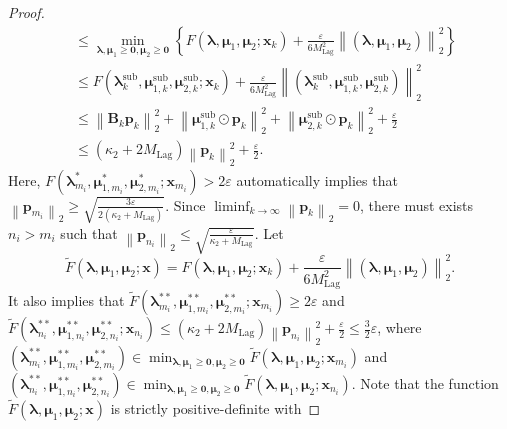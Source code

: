\documentclass[aos]{imsart}
\numberwithin{equation}{section}
\theoremstyle{plain}
\begin{document}
\begin{appendix}
\begin{proof}
\begin{equation}
\begin{split}
            & \leq \min_{\bm{\lambda}, \bm{\mu}_{1} \geq \bm{0}, \bm{\mu}_{2} \geq \bm{0}} \left\{F(\bm{\lambda}, \bm{\mu}_{1}, \bm{\mu}_2; \bm{x}_k) + \frac{\varepsilon}{6 M_{\text{Lag}}^2 } \left\|(\bm{\lambda}, \bm{\mu}_{1}, \bm{\mu}_2) \right\|_2^2 \right\} \\
            & \leq F(\bm{\lambda}_{k}^{\text{sub}}, \bm{\mu}_{1,k}^{\text{sub}}, \bm{\mu}_{2,k}^{\text{sub}}; \bm{x}_k) + \frac{\varepsilon}{6 M_{\text{Lag}}^2 } \left\|(\bm{\lambda}_{k}^{\text{sub}}, \bm{\mu}_{1,k}^{\text{sub}}, \bm{\mu}_{2,k}^{\text{sub}}) \right\|_2^2 \\
            & \leq \left\| \bm{B}_k \bm{p}_k \right\|_2^2 + \left\| \bm{\mu}_{1,k}^{\text{sub}} \odot \bm{p}_k \right\|_2^2 + \left\| \bm{\mu}_{2,k}^{\text{sub}} \odot \bm{p}_k \right\|_2^2 + \frac{\varepsilon}{2}\\
            & \leq (\kappa_2 + 2 M_{\text{Lag}}) \left\| \bm{p}_k \right\|_2^2 + \frac{\varepsilon}{2}.
        \end{split}
    \end{equation}
    Here, $F(\bm{\lambda}_{m_i}^{*}, \bm{\mu}_{1,m_i}^{*}, \bm{\mu}_{2,m_i}^{*}; \bm{x}_{m_i}) > 2 \varepsilon$ automatically implies that $\left\| \bm{p}_{m_i} \right\|_2 \geq \sqrt{\frac{3\varepsilon}{2(\kappa_2 + M_{\text{Lag}}) }}$. Since $\mathop{\lim \inf}_{k \to \infty} \left\| \bm{p}_k \right\|_2 = 0$, there must exists $n_i > m_i$ such that $\left\| \bm{p}_{n_i} \right\|_2 \leq \sqrt{\frac{\varepsilon}{\kappa_2 + M_{\text{Lag}} }}$.
    Let
    \begin{equation*}
        \widetilde{F}(\bm{\lambda}, \bm{\mu}_{1}, \bm{\mu}_2; \bm{x}) = F(\bm{\lambda}, \bm{\mu}_{1}, \bm{\mu}_2; \bm{x}_k) + \frac{\varepsilon}{6 M_{\text{Lag}}^2 } \left\|(\bm{\lambda}, \bm{\mu}_{1}, \bm{\mu}_2) \right\|_2^2.
    \end{equation*}
    It also implies that $\widetilde{F}(\bm{\lambda}_{m_i}^{**}, \bm{\mu}_{1,m_i}^{**}, \bm{\mu}_{2,m_i}^{**}; \bm{x}_{m_i}) \geq 2 \varepsilon$ and $ \widetilde{F}(\bm{\lambda}_{n_i}^{**}, \bm{\mu}_{1,n_i}^{**}, \bm{\mu}_{2,n_i}^{**}; \bm{x}_{n_i}) \leq (\kappa_2 + 2 M_{\text{Lag}}) \left\| \bm{p}_{n_i} \right\|_2^2 + \frac{\varepsilon}{2} \leq \frac{3}{2} \varepsilon$, where $(\bm{\lambda}_{m_i}^{**}, \bm{\mu}_{1,m_i}^{**}, \bm{\mu}_{2,m_i}^{**}) \in \min_{\bm{\lambda}, \bm{\mu}_{1} \geq \bm{0}, \bm{\mu}_{2} \geq \bm{0}} \widetilde{F}(\bm{\lambda}, \bm{\mu}_{1}, \bm{\mu}_2; \bm{x}_{m_i})$ and $(\bm{\lambda}_{n_i}^{**}, \bm{\mu}_{1,n_i}^{**}, \bm{\mu}_{2,n_i}^{**}) \in \min_{\bm{\lambda}, \bm{\mu}_{1} \geq \bm{0}, \bm{\mu}_{2} \geq \bm{0}} \widetilde{F}(\bm{\lambda}, \bm{\mu}_{1}, \bm{\mu}_2; \bm{x}_{n_i})$. Note that the function $\widetilde{F}(\bm{\lambda}, \bm{\mu}_{1}, \bm{\mu}_2; \bm{x})$ is strictly positive-definite with

\end{proof}
\end{appendix}
\end{document}
